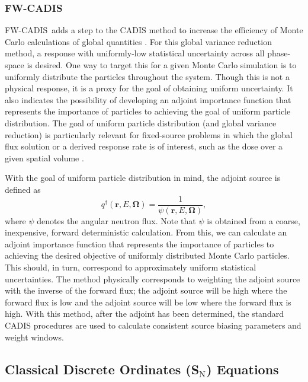 \documentclass{article} %
\newcommand{\bo}{\mathbf\Omega}
\newcommand{\vecr}{\textbf{r}}
\newcommand{\sn}{S$_\mathrm{N}$}
\newcommand{\fwc}{\mbox{FW-CADIS}}
\begin{document}
\subsubsection{\fwc}

\fwc\ adds a step to the CADIS method to increase the efficiency of Monte
Carlo calculations of global quantities \cite{fwcadis}. For this global
variance reduction method, a response with uniformly-low statistical
uncertainty across all phase-space is desired. One way to target this for a
given Monte Carlo simulation is to uniformly distribute the particles
throughout the system. Though this is not a physical response, it is a proxy
for the goal of obtaining uniform uncertainty. It also indicates the
possibility of developing an adjoint importance function that represents the
importance of particles to achieving the goal of uniform particle
distribution. The goal of uniform particle distribution (and global variance
reduction) is particularly relevant for fixed-source problems in which the
global flux solution or a derived response rate is of interest, such as the
dose over a given spatial volume \cite{wilsonslaybaugh}.

With the goal of uniform particle distribution in mind, the adjoint source is
defined as
%
\begin{equation}
q^{\dagger}(\vecr,E,\bo) = \frac{1}{\psi(\vecr,E,\bo)},
\end{equation}
%
where $\psi$ denotes the angular neutron flux. Note that $\psi$ is obtained
from a coarse, inexpensive, forward deterministic calculation. From this, we
can calculate an adjoint importance function that represents the importance of
particles to achieving the desired objective of uniformly distributed Monte
Carlo particles. This should, in turn, correspond to approximately uniform
statistical uncertainties. The method physically corresponds to weighting the
adjoint source with the inverse of the forward flux; the adjoint source will
be high where the forward flux is low and the adjoint source will be low where
the forward flux is high. With this method, after the adjoint has been
determined, the standard CADIS procedures are used to calculate consistent
source biasing parameters and weight windows.

\subsection{Classical Discrete Ordinates (\sn) Equations}
\end{document}

